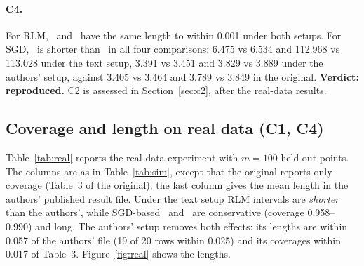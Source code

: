 \paragraph{C4.} For RLM, \LOO\ and \RO\ have the same length to within 0.001 under both setups. For SGD, \LOO\ is
shorter than \RO\ in all four comparisons: 6.475 vs 6.534 and 112.968 vs 113.028 under the text setup, 3.391 vs 3.451
and 3.829 vs 3.889 under the authors' setup, against 3.405 vs 3.464 and 3.789 vs 3.849 in the original.
\textbf{Verdict: reproduced.} C2 is assessed in Section~\ref{sec:c2}, after the real-data results.

\subsection{Coverage and length on real data (C1, C4)}

Table~\ref{tab:real} reports the real-data experiment with $m=100$ held-out points. The columns are as in
Table~\ref{tab:sim}, except that the original reports only coverage (Table~3 of the original); the last column gives
the mean length in the authors' published result file. Under the text setup RLM intervals are \emph{shorter} than the
authors', while SGD-based \RO\ and \LOO\ are conservative (coverage 0.958--0.990) and long. The authors' setup
removes both effects: its lengths are within 0.057 of the authors' file (19 of 20 rows within 0.025) and its
coverages within 0.017 of Table~3. Figure~\ref{fig:real} shows the lengths.

